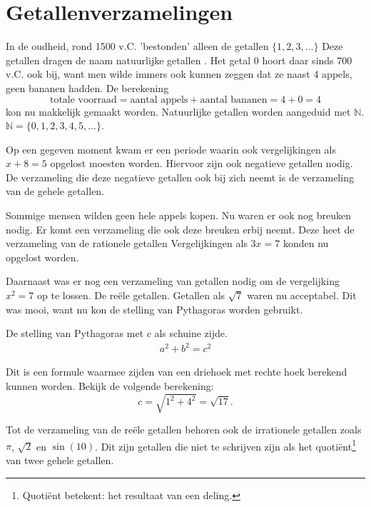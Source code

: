 \documentclass[11pt,fleqn]{book} %
\begin{document}
\section{Getallenverzamelingen}
In de oudheid, rond 1500 v.C. 'bestonden' alleen de getallen $\{1,2,3,\ldots\}$ Deze getallen dragen de naam natuurlijke getallen \cite{getal_en_ruimte}. Het getal 0 hoort daar sinds 700 v.C. ook bij, want men wilde immers ook kunnen zeggen dat ze naast 4 appels, geen bananen hadden. De berekening
\begin{displaymath}
\text{totale voorraad} = \text{aantal appels}+\text{aantal bananen}=4+0=4
\end{displaymath}
kon nu makkelijk gemaakt worden. Natuurlijke getallen worden aangeduid met $\mathbb{N}$. $\mathbb{N}=\{0,1,2,3,4,5,\ldots\}$.

Op een gegeven moment kwam er een periode waarin ook vergelijkingen als $x + 8 = 5$ opgelost moesten worden. Hiervoor zijn ook negatieve getallen nodig. De verzameling die deze negatieve getallen ook bij zich neemt is de verzameling van de gehele getallen.

Sommige mensen wilden geen hele appels kopen. Nu waren er ook nog breuken nodig. Er komt een verzameling die ook deze breuken erbij neemt. Deze heet de verzameling van de rationele getallen Vergelijkingen als $3x = 7$ konden nu opgelost worden.

Daarnaast was er nog een verzameling van getallen nodig om de vergelijking $x^2 = 7$ op te lossen. De reële getallen. Getallen als $\sqrt{7}$ waren nu acceptabel. Dit was mooi, want nu kon de stelling van Pythagoras worden gebruikt.
\begin{theorem}\label{eq:pyth}
De stelling van Pythagoras met $c$ als schuine zijde.
\begin{align}
a^2+b^2=c^2
\end{align}
\end{theorem}
Dit is een formule waarmee zijden van een driehoek met rechte hoek berekend kunnen worden. Bekijk de volgende berekening:
\begin{displaymath}
c=\sqrt{1^2+4^2}=\sqrt{17}.
\end{displaymath}

Tot de verzameling van de reële getallen behoren ook de irrationele getallen zoals $\pi$, $\sqrt{2}$ en $\sin{(10)}$. Dit zijn getallen die niet te schrijven zijn als het quotiënt\footnote{Quotiënt betekent: het resultaat van een deling.} van twee gehele getallen.
\end{document}
